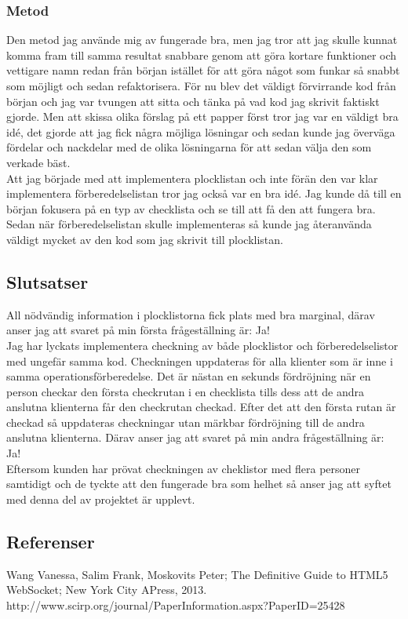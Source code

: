 \subsubsection{Metod}
Den metod jag använde mig av fungerade bra, men jag tror att jag skulle kunnat komma fram till samma resultat snabbare genom att göra kortare funktioner och vettigare namn redan från början istället för att göra något som funkar så snabbt som möjligt och sedan refaktorisera. För nu blev det väldigt förvirrande kod från början och jag var tvungen att sitta och tänka på vad kod jag skrivit faktiskt gjorde. Men att skissa olika förslag på ett papper först tror jag var en väldigt bra idé, det gjorde att jag fick några möjliga lösningar och sedan kunde jag överväga fördelar och nackdelar med de olika lösningarna för att sedan välja den som verkade bäst. \\

Att jag började med att implementera plocklistan och inte förän den var klar implementera förberedelselistan tror jag också var en bra idé. Jag kunde då till en början fokusera på en typ av checklista och se till att få den att fungera bra. Sedan när förberedelselistan skulle implementeras så kunde jag återanvända väldigt mycket av den kod som jag skrivit till plocklistan.
\pagebreak

\subsection{Slutsatser}
All nödvändig information i plocklistorna fick plats med bra marginal, därav anser jag att svaret på min första frågeställning är: Ja! \\

Jag har lyckats implementera checkning av både plocklistor och förberedelselistor med ungefär samma kod. Checkningen uppdateras för alla klienter som är inne i samma operationsförberedelse. Det är nästan en sekunds fördröjning när en person checkar den första checkrutan i en checklista tills dess att de andra anslutna klienterna får den checkrutan checkad. Efter det att den första rutan är checkad så uppdateras checkningar utan märkbar fördröjning till de andra anslutna klienterna. Därav anser jag att svaret på min andra frågeställning är: Ja!\\

Eftersom kunden har prövat checkningen av cheklistor med flera personer samtidigt och de tyckte att den fungerade bra som helhet så anser jag att syftet med denna del av projektet är upplevt.

\subsection{Referenser}
\vspace{-9mm}
\begin{thebibliography}{9}
 Wang Vanessa, Salim Frank, Moskovits Peter; The Definitive Guide to HTML5 WebSocket; New York City APress, 2013.
 http://www.scirp.org/journal/PaperInformation.aspx?PaperID=25428
\end{thebibliography}